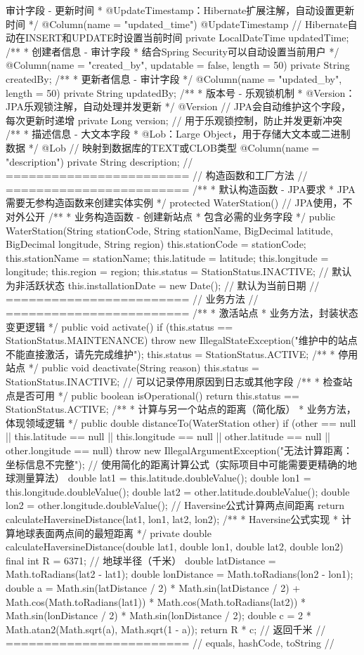 审计字段 - 更新时间 * @UpdateTimestamp：Hibernate扩展注解，自动设置更新时间 */ @Column(name = "updated_time") @UpdateTimestamp // Hibernate自动在INSERT和UPDATE时设置当前时间 private LocalDateTime updatedTime; /** * 创建者信息 - 审计字段 * 结合Spring Security可以自动设置当前用户 */ @Column(name = "created_by", updatable = false, length = 50) private String createdBy; /** * 更新者信息 - 审计字段 */ @Column(name = "updated_by", length = 50) private String updatedBy; /** * 版本号 - 乐观锁机制 * @Version：JPA乐观锁注解，自动处理并发更新 */ @Version // JPA会自动维护这个字段，每次更新时递增 private Long version; // 用于乐观锁控制，防止并发更新冲突 /** * 描述信息 - 大文本字段 * @Lob：Large Object，用于存储大文本或二进制数据 */ @Lob // 映射到数据库的TEXT或CLOB类型 @Column(name = "description") private String description; // ======================== // 构造函数和工厂方法 // ======================== /** * 默认构造函数 - JPA要求 * JPA需要无参构造函数来创建实体实例 */ protected WaterStation() { // JPA使用，不对外公开 } /** * 业务构造函数 - 创建新站点 * 包含必需的业务字段 */ public WaterStation(String stationCode, String stationName, BigDecimal latitude, BigDecimal longitude, String region) { this.stationCode = stationCode; this.stationName = stationName; this.latitude = latitude; this.longitude = longitude; this.region = region; this.status = StationStatus.INACTIVE; // 默认为非活跃状态 this.installationDate = new Date(); // 默认为当前日期 } // ======================== // 业务方法 // ======================== /** * 激活站点 * 业务方法，封装状态变更逻辑 */ public void activate() { if (this.status == StationStatus.MAINTENANCE) { throw new IllegalStateException("维护中的站点不能直接激活，请先完成维护"); } this.status = StationStatus.ACTIVE; } /** * 停用站点 */ public void deactivate(String reason) { this.status = StationStatus.INACTIVE; // 可以记录停用原因到日志或其他字段 } /** * 检查站点是否可用 */ public boolean isOperational() { return this.status == StationStatus.ACTIVE; } /** * 计算与另一个站点的距离（简化版） * 业务方法，体现领域逻辑 */ public double distanceTo(WaterStation other) { if (other == null || this.latitude == null || this.longitude == null || other.latitude == null || other.longitude == null) { throw new IllegalArgumentException("无法计算距离：坐标信息不完整"); } // 使用简化的距离计算公式（实际项目中可能需要更精确的地球测量算法） double lat1 = this.latitude.doubleValue(); double lon1 = this.longitude.doubleValue(); double lat2 = other.latitude.doubleValue(); double lon2 = other.longitude.doubleValue(); // Haversine公式计算两点间距离 return calculateHaversineDistance(lat1, lon1, lat2, lon2); } /** * Haversine公式实现 * 计算地球表面两点间的最短距离 */ private double calculateHaversineDistance(double lat1, double lon1, double lat2, double lon2) { final int R = 6371; // 地球半径（千米） double latDistance = Math.toRadians(lat2 - lat1); double lonDistance = Math.toRadians(lon2 - lon1); double a = Math.sin(latDistance / 2) * Math.sin(latDistance / 2) + Math.cos(Math.toRadians(lat1)) * Math.cos(Math.toRadians(lat2)) * Math.sin(lonDistance / 2) * Math.sin(lonDistance / 2); double c = 2 * Math.atan2(Math.sqrt(a), Math.sqrt(1 - a)); return R * c; // 返回千米 } // ======================== // equals, hashCode, toString // 